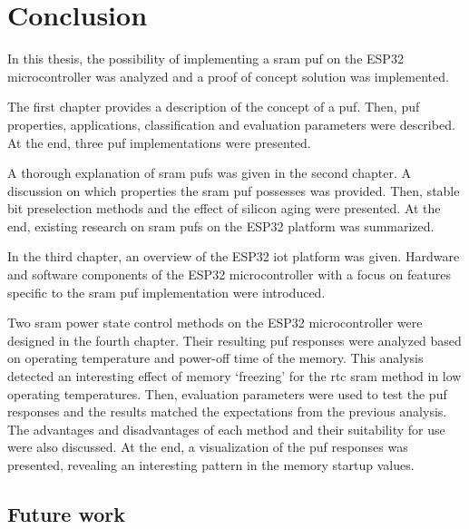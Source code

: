 \chapter*{Conclusion}\label{sec:conclusion}
{}

In this thesis, the possibility of implementing a \gls{sram} \gls{puf} on the ESP32 microcontroller was analyzed and a proof of concept solution was implemented. 

The first chapter provides a description of the concept of a \gls{puf}. Then, \gls{puf} properties, applications, classification and evaluation parameters were described. At the end, three \gls{puf} implementations were presented.

A thorough explanation of \gls{sram} \glspl{puf} was given in the second chapter. A discussion on which properties the \gls{sram} \gls{puf} possesses was provided. Then, stable bit preselection methods and the effect of silicon aging were presented. At the end, existing research on \gls{sram} \glspl{puf} on the ESP32 platform was summarized.

In the third chapter, an overview of the ESP32 \gls{iot} platform was given. Hardware and software components of the ESP32 microcontroller with a focus on features specific to the \gls{sram} \gls{puf} implementation were introduced.

Two \gls{sram} power state control methods on the ESP32 microcontroller were designed in the fourth chapter. Their resulting \gls{puf} responses were analyzed based on operating temperature and power-off time of the memory. This analysis detected an interesting effect of memory `freezing' for the \gls{rtc} \gls{sram} method in low operating temperatures. Then, evaluation parameters were used to test the \gls{puf} responses and the results matched the expectations from the previous analysis. The advantages and disadvantages of each method and their suitability for use were also discussed. At the end, a visualization of the \gls{puf} responses was presented, revealing an interesting pattern in the memory startup values.




\section*{Future work}
{}

